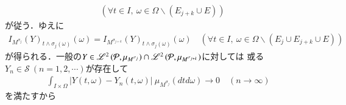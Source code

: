 \begin{prf}
\begin{description}
\begin{align}
					\quad (\forall t \in I,\ \omega \in \Omega \backslash (E_{j+k} \cup E))
				\end{align}
				が従う．ゆえに
				\begin{align}
					I_{M^{\sigma_j}}(Y)_{t \wedge \sigma_j(\omega)}(\omega) = I_{M^{\sigma_{j+k}}}(Y)_{t \wedge \sigma_j(\omega)}(\omega)
					\quad (\forall t \in I,\ \omega \in \Omega \backslash (E_j \cup E_{j+k} \cup E))
				\end{align}
				が得られる．一般の$Y \in \mathscr{L}^{2} \left(\mathcal{P},\mu_{M^{\sigma_j}}\right) \cap \mathscr{L}^{2} \left(\mathcal{P},\mu_{M^{\sigma_{j+k}}}\right)$に対しては
				或る$Y_n \in \mathcal{S}\ (n=1,2,\cdots)$が存在して
				\begin{align}
					\int_{I \times \Omega} \left| Y(t,\omega) - Y_n(t,\omega) \right|\ \mu_{M^{\sigma_j}}(dtd\omega)
					\longrightarrow 0
					\quad (n \longrightarrow \infty)
				\end{align}
				を満たすから
		\end{description}
		\QED
	\end{prf}
	